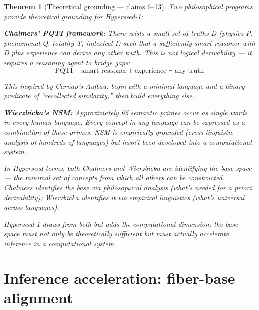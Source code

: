 \documentclass[11pt,a4paper]{article}
\newtheorem{theorem}[definition]{Theorem}
\begin{document}
\begin{theorem}[Theoretical grounding --- claims 6--13]
\label{thm:foundations}
Two philosophical programs provide theoretical grounding for Hyperseed-1:

\textbf{Chalmers' PQTI framework:} There exists a small set of truths D
(physics P, phenomenal Q, totality T, indexical I) such that a sufficiently
smart reasoner with D plus experience can derive any other truth. This is
not logical derivability --- it requires a reasoning agent to bridge gaps:
\[
  \text{PQTI} + \text{smart reasoner} + \text{experience}
  \vdash \text{any truth}
\]

This inspired by Carnap's Aufbau: begin with a minimal language and a
binary predicate of ``recollected similarity,'' then build everything else.

\textbf{Wierzbicka's NSM:} Approximately 65 semantic primes occur as
single words in every human language. Every concept in any language can be
expressed as a combination of these primes. NSM is empirically grounded
(cross-linguistic analysis of hundreds of languages) but hasn't been
developed into a computational system.

In Hyperseed terms, both Chalmers and Wierzbicka are identifying the
\emph{base space} --- the minimal set of concepts from which all others
can be constructed. Chalmers identifies the base via philosophical
analysis (what's needed for a priori derivability); Wierzbicka identifies
it via empirical linguistics (what's universal across languages).

Hyperseed-1 draws from both but adds the computational dimension: the
base space must not only be theoretically sufficient but must actually
accelerate inference in a computational system.
\end{theorem}

\section{Inference acceleration: fiber-base alignment}
\label{sec:acceleration}
\end{document}
